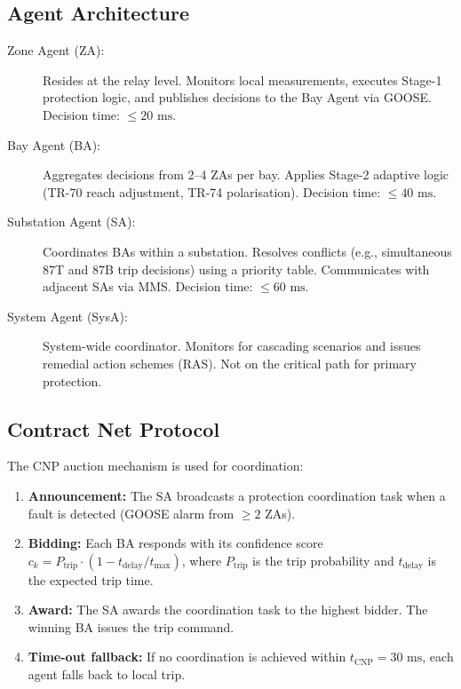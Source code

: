 \documentclass[11pt, a4paper]{article}
\newcommand{\ms}{\,\text{ms}}
\begin{document}
\subsection{Agent Architecture}

\begin{description}
  \item[Zone Agent (ZA):]
    Resides at the relay level. Monitors local measurements, executes
    Stage-1 protection logic, and publishes decisions to the Bay Agent
    via GOOSE. Decision time: $\leq 20\,\ms$.

  \item[Bay Agent (BA):]
    Aggregates decisions from 2--4 ZAs per bay. Applies Stage-2
    adaptive logic (TR-70 reach adjustment, TR-74 polarisation).
    Decision time: $\leq 40\,\ms$.

  \item[Substation Agent (SA):]
    Coordinates BAs within a substation. Resolves conflicts (e.g.,
    simultaneous 87T and 87B trip decisions) using a priority table.
    Communicates with adjacent SAs via MMS. Decision time: $\leq 60\,\ms$.

  \item[System Agent (SysA):]
    System-wide coordinator. Monitors for cascading scenarios and
    issues remedial action schemes (RAS). Not on the critical path
    for primary protection.
\end{description}

\subsection{Contract Net Protocol}

The CNP auction mechanism is used for coordination:
\begin{enumerate}
  \item \textbf{Announcement:} The SA broadcasts a protection coordination
    task when a fault is detected (GOOSE alarm from $\geq 2$ ZAs).
  \item \textbf{Bidding:} Each BA responds with its confidence score
    $c_k = P_{\mathrm{trip}} \cdot (1 - t_{\mathrm{delay}}/t_{\mathrm{max}})$,
    where $P_{\mathrm{trip}}$ is the trip probability and $t_{\mathrm{delay}}$
    is the expected trip time.
  \item \textbf{Award:} The SA awards the coordination task to the highest
    bidder. The winning BA issues the trip command.
  \item \textbf{Time-out fallback:} If no coordination is achieved within
    $t_{\mathrm{CNP}} = 30\,\ms$, each agent falls back to local trip.
\end{enumerate}
\end{document}
